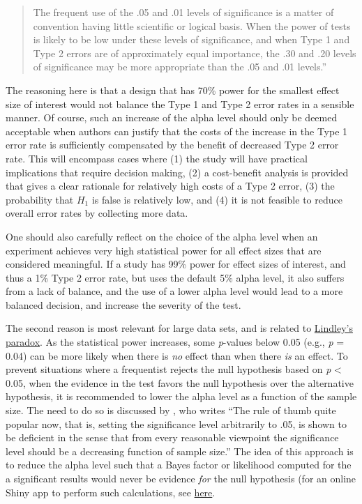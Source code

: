 \documentclass[
  oneside]{book}
\begin{document}
\begin{quote}
The frequent use of the .05 and .01 levels of significance is a matter of convention having little scientific or logical basis. When the power of tests is likely to be low under these levels of significance, and when Type 1 and Type 2 errors are of approximately equal importance, the .30 and .20 levels of significance may be more appropriate than the .05 and .01 levels.''
\end{quote}

The reasoning here is that a design that has 70\% power for the smallest effect size of interest would not balance the Type 1 and Type 2 error rates in a sensible manner. Of course, such an increase of the alpha level should only be deemed acceptable when authors can justify that the costs of the increase in the Type 1 error rate is sufficiently compensated by the benefit of decreased Type 2 error rate. This will encompass cases where (1) the study will have practical implications that require decision making, (2) a cost-benefit analysis is provided that gives a clear rationale for relatively high costs of a Type 2 error, (3) the probability that \(H_1\) is false is relatively low, and (4) it is not feasible to reduce overall error rates by collecting more data.

One should also carefully reflect on the choice of the alpha level when an experiment achieves very high statistical power for all effect sizes that are considered meaningful. If a study has 99\% power for effect sizes of interest, and thus a 1\% Type 2 error rate, but uses the default 5\% alpha level, it also suffers from a lack of balance, and the use of a lower alpha level would lead to a more balanced decision, and increase the severity of the test.

The second reason is most relevant for large data sets, and is related to \protect\hyperlink{lindley}{Lindley's paradox}. As the statistical power increases, some \emph{p}-values below 0.05 (e.g., \emph{p} = 0.04) can be more likely when there is \emph{no} effect than when there \emph{is} an effect. To prevent situations where a frequentist rejects the null hypothesis based on \emph{p} \textless{} 0.05, when the evidence in the test favors the null hypothesis over the alternative hypothesis, it is recommended to lower the alpha level as a function of the sample size. The need to do so is discussed by \citet{leamer_specification_1978}, who writes ``The rule of thumb quite popular now, that is, setting the significance level arbitrarily to .05, is shown to be deficient in the sense that from every reasonable viewpoint the significance level should be a decreasing function of sample size.'' The idea of this approach is to reduce the alpha level such that a Bayes factor or likelihood computed for the a significant results would never be evidence \emph{for} the null hypothesis (for an online Shiny app to perform such calculations, see \href{https://shiny.ieis.tue.nl/JustifyAlpha/}{here}.
\end{document}
